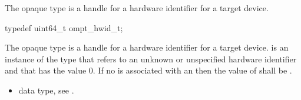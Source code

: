 \label{sec:ompt_hwid_t}

\summary
The  opaque type is a handle for a hardware identifier 
for a target device.

\format
\begin{ccppspecific}
\begin{omptOther}
typedef uint64_t ompt_hwid_t;
\end{omptOther}
\end{ccppspecific}

\label{sec:ompt_hwid_none}
The  opaque type is a handle for a hardware identifier 
for a target device.  is an instance of the type
that refers to an unknown or unspecified hardware identifier and that
has the value 0. If no  is associated with an 
then the value of  shall be .

\crossreferences
\begin{itemize}
\item {} data type, 
see .
\end{itemize}

